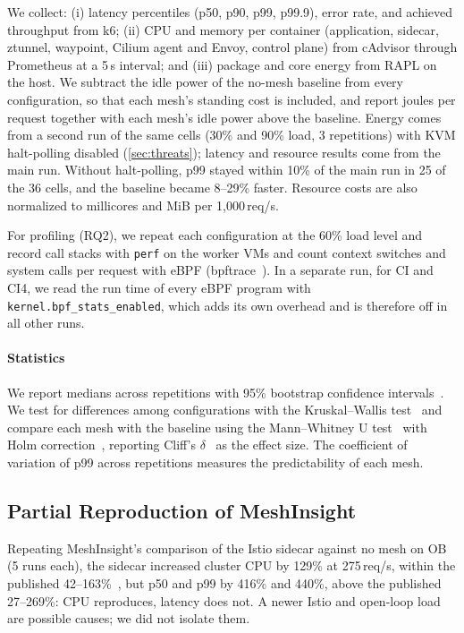 We collect: (i) latency percentiles (p50, p90, p99, p99.9), error rate, and
achieved throughput from k6; (ii) CPU and memory per container (application,
sidecar, ztunnel, waypoint, Cilium agent and Envoy, control plane) from
cAdvisor through Prometheus at a 5\,s interval; and (iii) package and core
energy from RAPL on the host. We subtract the idle power of the no-mesh
baseline from every configuration, so that each mesh's standing cost is
included, and report joules per request together with each mesh's idle power
above the baseline. Energy comes from a second run of the same cells (30\%
and 90\% load, 3 repetitions) with KVM halt-polling disabled
(\cref{sec:threats}); latency and resource results come from the main run.
Without halt-polling, p99 stayed within 10\% of the main run in 25 of the 36
cells, and the baseline became 8--29\% faster. Resource
costs are also
normalized to millicores and MiB per 1{,}000\,req/s.

For profiling (RQ2), we repeat each configuration at the 60\% load level and
record call stacks with \texttt{perf} on the worker VMs and count context
switches and system calls per request with eBPF (bpftrace~\cite{bpftrace}). In a separate
run, for CI and CI4, we read the run time of every eBPF program with
\texttt{kernel.bpf\_stats\_enabled}, which adds its own overhead and is
therefore off in all other runs.

\paragraph{Statistics}
We report medians across repetitions with 95\% bootstrap confidence
intervals~\cite{efron1979bootstrap}.
We test for differences among configurations with the Kruskal--Wallis test~\cite{kruskal1952ranks} and
compare each mesh with the baseline using the Mann--Whitney U test~\cite{mann1947test} with Holm
correction~\cite{holm1979simple}, reporting Cliff's $\delta$~\cite{cliff1993dominance} as the effect size. The coefficient of
variation of p99 across repetitions measures the predictability of each mesh.

\subsection{Partial Reproduction of MeshInsight}
\label{sec:validation}

Repeating MeshInsight's comparison of the Istio sidecar against no mesh on
OB (5 runs each), the sidecar increased cluster CPU by 129\% at 275\,req/s,
within the published 42--163\%~\cite{zhu2023meshinsight}, but p50 and p99 by
416\% and 440\%, above the published 27--269\%: CPU reproduces, latency does
not. A newer Istio and open-loop load are possible causes; we did not isolate
them.

